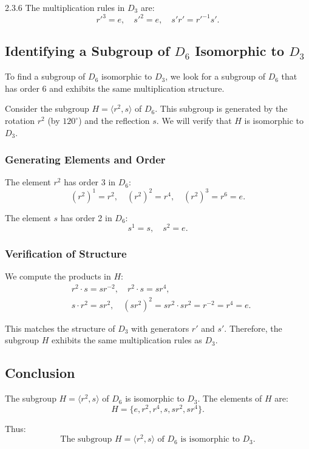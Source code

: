 \documentclass[12pt]{amsart}
\theoremstyle{definition}
\numberwithin{equation}{section}
\begin{document}
\begin{exercise}{2.3.6}
    The multiplication rules in \(D_3\) are:
    \[
    r'^3 = e, \quad s'^2 = e, \quad s'r' = r'^{-1}s'.
    \]
    
    \subsection*{Identifying a Subgroup of \(D_6\) Isomorphic to \(D_3\)}
    
    To find a subgroup of \(D_6\) isomorphic to \(D_3\), we look for a subgroup of \(D_6\) that has order 6 and exhibits the same multiplication structure.
    
    Consider the subgroup \(H = \langle r^2, s \rangle\) of \(D_6\). This subgroup is generated by the rotation \(r^2\) (by \(120^\circ\)) and the reflection \(s\). We will verify that \(H\) is isomorphic to \(D_3\).
    
    \subsubsection*{Generating Elements and Order}
    The element \(r^2\) has order 3 in \(D_6\):
    \[
    (r^2)^1 = r^2, \quad (r^2)^2 = r^4, \quad (r^2)^3 = r^6 = e.
    \]
    
    The element \(s\) has order 2 in \(D_6\):
    \[
    s^1 = s, \quad s^2 = e.
    \]
    
    \subsubsection*{Verification of Structure}
    
    We compute the products in \(H\):
    \[
    \begin{aligned}
    &r^2 \cdot s = sr^{-2}, \quad r^2 \cdot s = sr^4, \\
    &s \cdot r^2 = sr^2, \quad (sr^2)^2 = sr^2 \cdot sr^2 = r^{-2} = r^4 = e.
    \end{aligned}
    \]
    
    This matches the structure of \(D_3\) with generators \(r'\) and \(s'\). Therefore, the subgroup \(H\) exhibits the same multiplication rules as \(D_3\).
    
    \subsection*{Conclusion}
    
    The subgroup \(H = \langle r^2, s \rangle\) of \(D_6\) is isomorphic to \(D_3\). The elements of \(H\) are:
    \[
    H = \{e, r^2, r^4, s, sr^2, sr^4\}.
    \]
    
    Thus:
    \[
    \text{The subgroup } H = \langle r^2, s \rangle \text{ of } D_6 \text{ is isomorphic to } D_3.
    \]
    
    \end{exercise}
    \newpage
    
\end{document}
